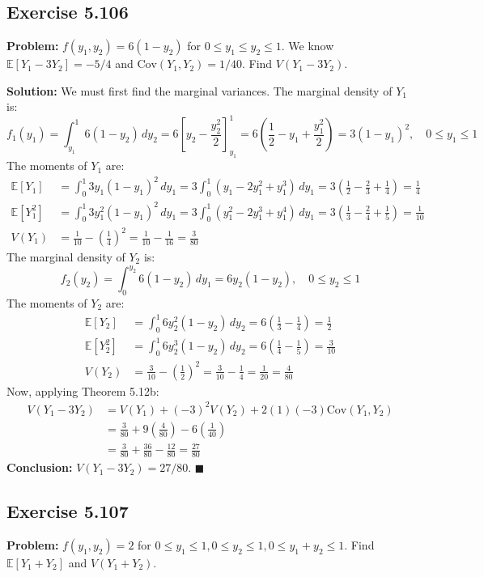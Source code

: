 \documentclass[11pt, a4paper]{article}
\theoremstyle{definition}
\theoremstyle{remark}
\newcommand{\E}{\mathbb{E}}
\begin{document}
\subsection{Exercise 5.106}
\textbf{Problem:} $f(y_1, y_2) = 6(1-y_2)$ for $0 \le y_1 \le y_2 \le 1$. We know $\E[Y_1 - 3Y_2] = -5/4$ and $\text{Cov}(Y_1, Y_2) = 1/40$. Find $V(Y_1 - 3Y_2)$.

\textbf{Solution:}
We must first find the marginal variances.
The marginal density of $Y_1$ is:
\[ f_1(y_1) = \int_{y_1}^1 6(1-y_2) \, dy_2 = 6 \left[ y_2 - \frac{y_2^2}{2} \right]_{y_1}^1 = 6 \left( \frac{1}{2} - y_1 + \frac{y_1^2}{2} \right) = 3(1-y_1)^2, \quad 0 \le y_1 \le 1 \]
The moments of $Y_1$ are:
\begin{align*}
\E[Y_1] &= \int_0^1 3y_1(1-y_1)^2 \, dy_1 = 3 \int_0^1 (y_1 - 2y_1^2 + y_1^3) \, dy_1 = 3\left(\frac{1}{2} - \frac{2}{3} + \frac{1}{4}\right) = \frac{1}{4} \\
\E[Y_1^2] &= \int_0^1 3y_1^2(1-y_1)^2 \, dy_1 = 3 \int_0^1 (y_1^2 - 2y_1^3 + y_1^4) \, dy_1 = 3\left(\frac{1}{3} - \frac{2}{4} + \frac{1}{5}\right) = \frac{1}{10} \\
V(Y_1) &= \frac{1}{10} - \left(\frac{1}{4}\right)^2 = \frac{1}{10} - \frac{1}{16} = \frac{3}{80}
\end{align*}
The marginal density of $Y_2$ is:
\[ f_2(y_2) = \int_0^{y_2} 6(1-y_2) \, dy_1 = 6y_2(1-y_2), \quad 0 \le y_2 \le 1 \]
The moments of $Y_2$ are:
\begin{align*}
\E[Y_2] &= \int_0^1 6y_2^2(1-y_2) \, dy_2 = 6\left(\frac{1}{3} - \frac{1}{4}\right) = \frac{1}{2} \\
\E[Y_2^2] &= \int_0^1 6y_2^3(1-y_2) \, dy_2 = 6\left(\frac{1}{4} - \frac{1}{5}\right) = \frac{3}{10} \\
V(Y_2) &= \frac{3}{10} - \left(\frac{1}{2}\right)^2 = \frac{3}{10} - \frac{1}{4} = \frac{1}{20} = \frac{4}{80}
\end{align*}
Now, applying Theorem 5.12b:
\begin{align*}
V(Y_1 - 3Y_2) &= V(Y_1) + (-3)^2 V(Y_2) + 2(1)(-3)\text{Cov}(Y_1, Y_2) \\
&= \frac{3}{80} + 9\left(\frac{4}{80}\right) - 6\left(\frac{1}{40}\right) \\
&= \frac{3}{80} + \frac{36}{80} - \frac{12}{80} = \frac{27}{80}
\end{align*}
\textbf{Conclusion:} $V(Y_1 - 3Y_2) = 27/80$. $\blacksquare$

\subsection{Exercise 5.107}
\textbf{Problem:} $f(y_1, y_2) = 2$ for $0 \le y_1 \le 1, 0 \le y_2 \le 1, 0 \le y_1+y_2 \le 1$. Find $\E[Y_1+Y_2]$ and $V(Y_1+Y_2)$.
\end{document}
